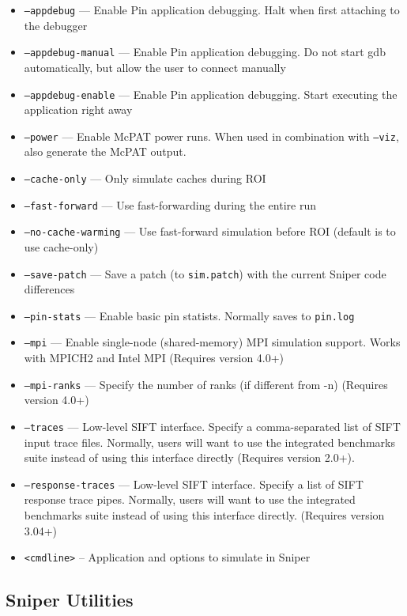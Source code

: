 \documentclass[a4paper,11pt,titlepage]{article}
\newcommand{\opt}[1]{{\tt #1}}
\begin{document}
\begin{itemize}[label=$$]
\item \opt{--appdebug} --- Enable Pin application debugging. Halt when first attaching to the debugger
\item \opt{--appdebug-manual} --- Enable Pin application debugging. Do not start gdb automatically, but allow the user to connect manually
\item \opt{--appdebug-enable} --- Enable Pin application debugging. Start executing the application right away
\item \opt{--power} --- Enable McPAT power runs. When used in combination with \opt{--viz}, also generate the McPAT output.
\item \opt{--cache-only} --- Only simulate caches during ROI
\item \opt{--fast-forward} --- Use fast-forwarding during the entire run
\item \opt{--no-cache-warming} --- Use fast-forward simulation before ROI (default is to use cache-only)
\item \opt{--save-patch} --- Save a patch (to \opt{sim.patch}) with the current Sniper code differences
\item \opt{--pin-stats} --- Enable basic pin statists. Normally saves to \opt{pin.log}
\item \opt{--mpi} --- Enable single-node (shared-memory) MPI simulation support. Works with MPICH2 and Intel MPI (Requires version 4.0+)
\item \opt{--mpi-ranks} --- Specify the number of ranks (if different from -n) (Requires version 4.0+)
\item \opt{--traces} --- Low-level SIFT interface. Specify a comma-separated list of SIFT input trace files. Normally, users will want to use the integrated benchmarks suite instead of using this interface directly (Requires version 2.0+).
\item \opt{--response-traces} --- Low-level SIFT interface. Specify a list of SIFT response trace pipes. Normally, users will want to use the integrated benchmarks suite instead of using this interface directly. (Requires version 3.04+)
\item \opt{<cmdline>} -- Application and options to simulate in Sniper
\end{itemize}



\subsection{Sniper Utilities}
\end{document}
